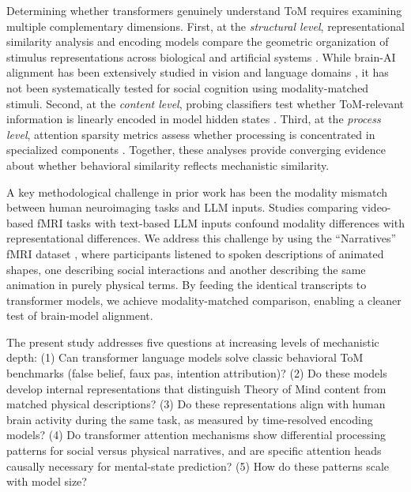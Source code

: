 \documentclass[conference]{IEEEtran}
\begin{document}
Determining whether transformers genuinely understand ToM requires examining multiple complementary dimensions. First, at the \textit{structural level}, representational similarity analysis and encoding models compare the geometric organization of stimulus representations across biological and artificial systems \cite{kriegeskorte2008representational}. While brain-AI alignment has been extensively studied in vision \cite{khaligh2014deep} and language domains \cite{schrimpf2021neural, caucheteux2022brains, goldstein2022shared}, it has not been systematically tested for social cognition using modality-matched stimuli. Second, at the \textit{content level}, probing classifiers test whether ToM-relevant information is linearly encoded in model hidden states \cite{elhage2021mathematical}. Third, at the \textit{process level}, attention sparsity metrics assess whether processing is concentrated in specialized components \cite{wang2022interpretability, conmy2023towards}. Together, these analyses provide converging evidence about whether behavioral similarity reflects mechanistic similarity.

A key methodological challenge in prior work has been the modality mismatch between human neuroimaging tasks and LLM inputs. Studies comparing video-based fMRI tasks with text-based LLM inputs confound modality differences with representational differences. We address this challenge by using the ``Narratives'' fMRI dataset \cite{nastase2021narratives}, where participants listened to spoken descriptions of animated shapes, one describing social interactions and another describing the same animation in purely physical terms. By feeding the identical transcripts to transformer models, we achieve modality-matched comparison, enabling a cleaner test of brain-model alignment.

The present study addresses five questions at increasing levels of mechanistic depth: (1) Can transformer language models solve classic behavioral ToM benchmarks (false belief, faux pas, intention attribution)? (2) Do these models develop internal representations that distinguish Theory of Mind content from matched physical descriptions? (3) Do these representations align with human brain activity during the same task, as measured by time-resolved encoding models? (4) Do transformer attention mechanisms show differential processing patterns for social versus physical narratives, and are specific attention heads causally necessary for mental-state prediction? (5) How do these patterns scale with model size?
\end{document}

